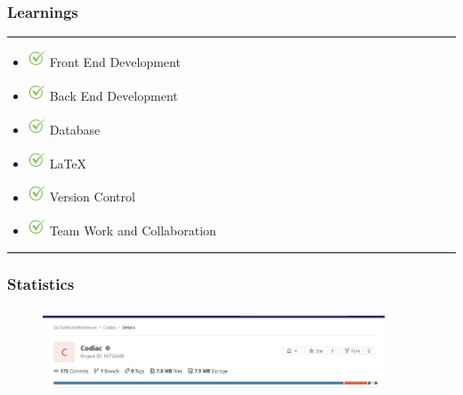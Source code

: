 \documentclass[14pt]{beamer}
\begin{document}
\begin{frame}
    \frametitle{Learnings}
    \noindent
    {\color{pink} \rule{\linewidth}{0.7mm} }
    \begin{itemize}
    \item [] \includegraphics[width=0.2in, height=0.2in]{./logos/check.png} Front End Development \\
        \pause
    \item [] \includegraphics[width=0.2in, height=0.2in]{./logos/check.png} Back End Development \\
        \pause
    \item [] \includegraphics[width=0.2in, height=0.2in]{./logos/check.png} Database\\
        \pause
   \item [] \includegraphics[width=0.2in, height=0.2in]{./logos/check.png} LaTeX \\
       \pause
   \item [] \includegraphics[width=0.2in, height=0.2in]{./logos/check.png} Version Control \\
       \pause
   \item [] \includegraphics[width=0.2in, height=0.2in]{./logos/check.png} Team Work and Collaboration\\
\end{itemize}
\noindent
    {\color{pink} \rule{\linewidth}{0.7mm} }
\end{frame}


\begin{frame}
      \frametitle{Statistics}
        \begin{figure}[htbp]
        \centerline{\includegraphics[width=4in, height=1in]{./logos/commit.jpeg}}
  \end{figure}
\end{frame}
\end{document}

